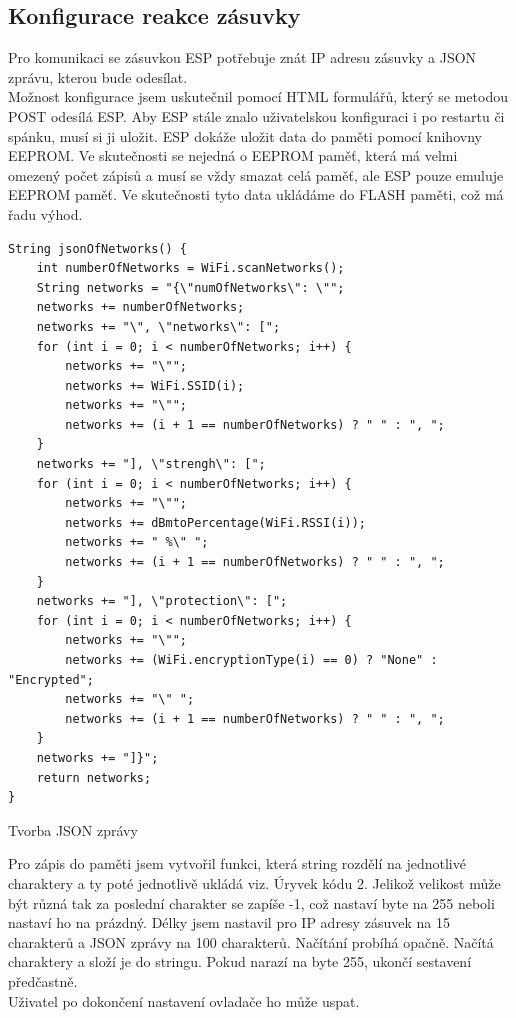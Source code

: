 \documentclass[a4paper, 12pt]{report}
\begin{document}
    \subsection{Konfigurace reakce zásuvky}
    Pro komunikaci se zásuvkou ESP potřebuje znát IP adresu zásuvky a JSON zprávu, kterou bude odesílat.\\ Možnost konfigurace jsem uskutečnil pomocí HTML formulářů, který se metodou POST odesílá ESP. Aby ESP stále znalo uživatelskou konfiguraci i po restartu či spánku, musí si ji uložit.
    ESP dokáže uložit data do paměti pomocí knihovny EEPROM. Ve skutečnosti se nejedná o EEPROM paměť, která má velmi omezený počet zápisů a musí se vždy smazat celá paměť, ale ESP pouze emuluje EEPROM paměť.
    Ve skutečnosti tyto data ukládáme do FLASH paměti, což má řadu výhod.\\
    \begin{listing}[]
        \begin{verbatim}
String jsonOfNetworks() {
    int numberOfNetworks = WiFi.scanNetworks();
    String networks = "{\"numOfNetworks\": \"";
    networks += numberOfNetworks;
    networks += "\", \"networks\": [";
    for (int i = 0; i < numberOfNetworks; i++) {
        networks += "\"";
        networks += WiFi.SSID(i);
        networks += "\"";
        networks += (i + 1 == numberOfNetworks) ? " " : ", ";
    }
    networks += "], \"strengh\": [";
    for (int i = 0; i < numberOfNetworks; i++) {
        networks += "\"";
        networks += dBmtoPercentage(WiFi.RSSI(i));
        networks += " %\" ";
        networks += (i + 1 == numberOfNetworks) ? " " : ", ";
    }
    networks += "], \"protection\": [";
    for (int i = 0; i < numberOfNetworks; i++) {
        networks += "\"";
        networks += (WiFi.encryptionType(i) == 0) ? "None" : "Encrypted";
        networks += "\" ";
        networks += (i + 1 == numberOfNetworks) ? " " : ", ";
    }
    networks += "]}";
    return networks;
}
        \end{verbatim}
        \label{lst:json}
        \caption{Tvorba JSON zprávy}
    \end{listing}
    Pro zápis do paměti jsem vytvořil funkci, která string rozdělí na jednotlivé charaktery a ty poté jednotlivě ukládá viz. Úryvek kódu 2.
    Jelikož velikost může být různá tak za poslední charakter se zapíše -1, což nastaví byte na 255 neboli nastaví ho na prázdný.
    Délky jsem nastavil pro IP adresy zásuvek na 15 charakterů a JSON zprávy na 100 charakterů.
    Načítání probíhá opačně.
    Načítá charaktery a složí je do stringu.
    Pokud narazí na byte 255, ukončí sestavení předčastně.\\
    Uživatel po dokončení nastavení ovladače ho může uspat.\\
\end{document}
